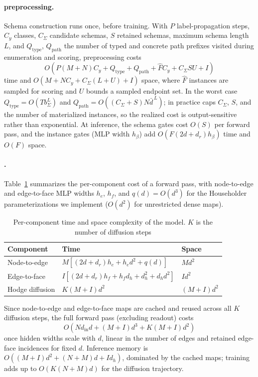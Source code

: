 \paragraph{\ampss{} preprocessing.} Schema construction runs once, before training. With $P$
label-propagation steps, $C_y$ classes, $C_\Sigma$ candidate schemas, $S$ retained schemas,
maximum schema length $L$, and $Q_{\mathrm{type}}$, $Q_{\mathrm{path}}$ the number of typed
and concrete path prefixes visited during enumeration and scoring, preprocessing costs
\[
O\!\left(P(M+N)C_y + Q_{\mathrm{type}} + Q_{\mathrm{path}} + \widehat{F}C_y + C_\Sigma S U + I\right)
\]
time and $O\!\left(M+NC_y+C_\Sigma(L+U)+I\right)$ space, where $\widehat{F}$ instances are
sampled for scoring and $U$ bounds a sampled endpoint set. In the worst case
$Q_{\mathrm{type}}=O(Tb_\Sigma^{L})$ and $Q_{\mathrm{path}}=O((C_\Sigma+S)N\bar{d}^{\,L})$;
in practice \ampss{} caps $C_\Sigma$, $S$, and the number of materialized instances, so the
realized cost is output-sensitive rather than exponential. At inference, the schema gates
cost $O(S)$ per forward pass, and the instance gates (MLP width $h_\beta$) add
$O\!\left(F(2d+d_r)h_\beta\right)$ time and $O(F)$ space.

\paragraph{\method{}.} Table~\ref{tab:complexity} summarizes the per-component
cost of a forward pass, with node-to-edge and edge-to-face MLP widths $h_e$, $h_f$, and
$q(d)=O(d^3)$ for the Householder parameterizations we implement ($O(d^2)$ for
unrestricted dense maps).

\begin{table}[h]
\centering
\small
\caption{Per-component time and space complexity of the \method{} model. $K$ is the number of diffusion steps}
\label{tab:complexity}
\begin{tabular}{lll}
\toprule
Component & Time & Space \\
\midrule
Node-to-edge & $M\left[(2d+d_r)h_e+h_ed^2+q(d)\right]$ & $Md^2$ \\
Edge-to-face & $I\left[(2d+d_r)h_f+h_fd_h+d_h^2+d_hd^2\right]$ & $Id^2$ \\
Hodge diffusion & $K(M+I)d^2$ & $(M+I)d^2$ \\
\bottomrule
\end{tabular}
\end{table}

Since node-to-edge and edge-to-face maps are cached and reused across all $K$ diffusion
steps, the full forward pass (excluding readout) costs
\[
O\!\left(Nd_{\mathrm{in}}d + (M+I)d^3 + K(M+I)d^2\right)
\]
once hidden widths scale with $d$, linear in the number of edges and retained edge-face
incidences for fixed $d$. Inference memory is $O\!\left((M+I)d^2+(N+M)d+Id_h\right)$,
dominated by the cached maps; training adds up to $O(K(N+M)d)$ for the diffusion trajectory.

